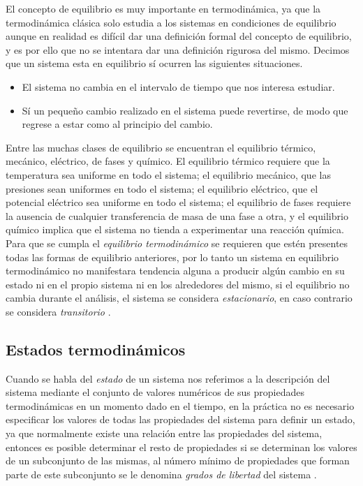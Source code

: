 \documentclass[../master.tex]{subfiles}
\begin{document}
El concepto de equilibrio es muy importante en termodinámica, ya que la termodinámica clásica solo estudia a los sistemas en condiciones de equilibrio aunque en realidad es difícil dar una definición formal del concepto de equilibrio, y es por ello que no se intentara dar una definición rigurosa del mismo. Decimos que un sistema esta en equilibrio sí ocurren las siguientes situaciones.
\begin{itemize}
    \item El sistema no cambia en el intervalo de tiempo que nos interesa estudiar.
    \item Sí un pequeño cambio realizado en el sistema puede revertirse, de modo que regrese a estar como al principio del cambio.
\end{itemize}
Entre las muchas clases de equilibrio se encuentran el equilibrio térmico, mecánico, eléctrico, de fases y químico. El equilibrio térmico requiere que la temperatura sea uniforme en todo el sistema; el equilibrio mecánico, que las presiones sean uniformes en todo el sistema; el equilibrio eléctrico, que el potencial eléctrico sea uniforme en todo el sistema; el equilibrio de fases requiere la ausencia de cualquier transferencia de masa de una fase a otra, y el equilibrio químico implica que el sistema no tienda a experimentar una reacción química. Para que se cumpla el \emph{equilibrio termodinámico} se requieren que estén presentes todas las formas de equilibrio anteriores, por lo tanto un sistema en equilibrio termodinámico no manifestara tendencia alguna a producir algún cambio en su estado ni en el propio sistema ni en los alrededores del mismo, si el equilibrio no cambia durante el análisis, el sistema se considera \emph{estacionario}, en caso contrario se considera \emph{transitorio} \parencites{clavell}{wark}{bett}.

\subsection{Estados termodinámicos}

Cuando se habla del \emph{estado} de un sistema nos referimos a la descripción del sistema mediante el conjunto de valores numéricos de sus propiedades termodinámicas en un momento dado en el tiempo, en la práctica no es necesario especificar los valores de todas las propiedades del sistema para definir un estado, ya que normalmente existe una relación entre las propiedades del sistema, entonces es posible determinar el resto de propiedades si se determinan los valores de un subconjunto de las mismas, al número mínimo de propiedades que forman parte de este subconjunto se le denomina \emph{grados de libertad} del sistema \parencites{moranshapiro}{faires}{colin}.
\end{document}
